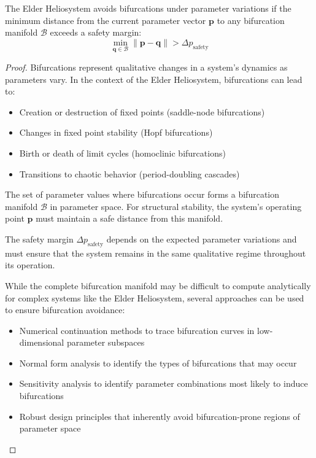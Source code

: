\begin{theorem}
The Elder Heliosystem avoids bifurcations under parameter variations if the minimum distance from the current parameter vector $\mathbf{p}$ to any bifurcation manifold $\mathcal{B}$ exceeds a safety margin:
\begin{equation}
\min_{\mathbf{q} \in \mathcal{B}} \|\mathbf{p} - \mathbf{q}\| > \Delta p_{\text{safety}}
\end{equation}
\end{theorem}

\begin{proof}
Bifurcations represent qualitative changes in a system's dynamics as parameters vary. In the context of the Elder Heliosystem, bifurcations can lead to:
\begin{itemize}
    \item Creation or destruction of fixed points (saddle-node bifurcations)
    \item Changes in fixed point stability (Hopf bifurcations)
    \item Birth or death of limit cycles (homoclinic bifurcations)
    \item Transitions to chaotic behavior (period-doubling cascades)
\end{itemize}

The set of parameter values where bifurcations occur forms a bifurcation manifold $\mathcal{B}$ in parameter space. For structural stability, the system's operating point $\mathbf{p}$ must maintain a safe distance from this manifold.

The safety margin $\Delta p_{\text{safety}}$ depends on the expected parameter variations and must ensure that the system remains in the same qualitative regime throughout its operation.

While the complete bifurcation manifold may be difficult to compute analytically for complex systems like the Elder Heliosystem, several approaches can be used to ensure bifurcation avoidance:
\begin{itemize}
    \item Numerical continuation methods to trace bifurcation curves in low-dimensional parameter subspaces
    \item Normal form analysis to identify the types of bifurcations that may occur
    \item Sensitivity analysis to identify parameter combinations most likely to induce bifurcations
    \item Robust design principles that inherently avoid bifurcation-prone regions of parameter space
\end{itemize}


\end{proof}
